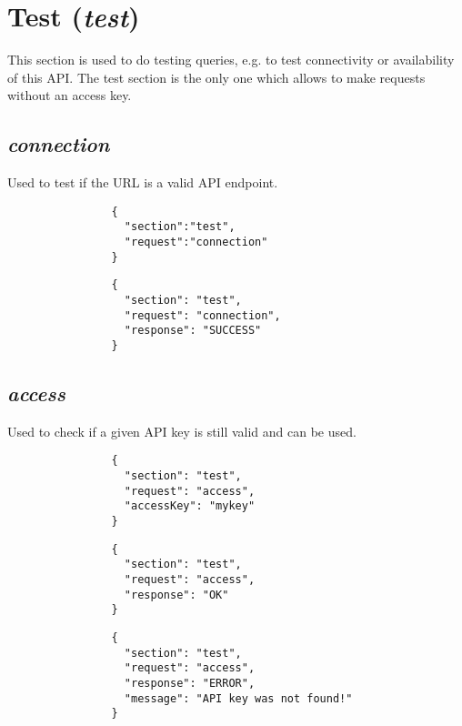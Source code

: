 \documentclass{article}
\begin{document}
	\section*{Test (\textit{test})}
		This section is used to do testing queries, e.g. to test connectivity or availability of this API. The test section is the only one which allows to make requests without an access key.
		\subsection*{\textit{connection}}
			Used to test if the URL is a valid API endpoint.
			{
				\color{blue}
				\begin{verbatim}
				{
				  "section":"test",
				  "request":"connection"
				}
				\end{verbatim}
		    }
			
			{
				\color{OliveGreen}
				\begin{verbatim}
				{
				  "section": "test",
				  "request": "connection",
				  "response": "SUCCESS"
				}
				\end{verbatim}
			}
		\subsection*{\textit{access}}
			Used to check if a given API key is still valid and can be used.
			{
				\color{blue}
				\begin{verbatim}
				{
				  "section": "test",
				  "request": "access",
				  "accessKey": "mykey"
				}
				\end{verbatim}
			}
			{
				\color{OliveGreen}
				\begin{verbatim}
				{
				  "section": "test",
				  "request": "access",
				  "response": "OK"
				}
				\end{verbatim}
			}
			{
				\color{BrickRed}
				\begin{verbatim}
				{
				  "section": "test",
				  "request": "access",
				  "response": "ERROR",
				  "message": "API key was not found!"
				}
				\end{verbatim}
			}
\end{document}
